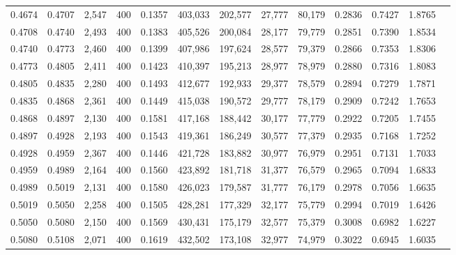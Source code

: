 \begin{tabular}{rrrrrrrrrrrrr}
0.4674 & 0.4707 &  2,547 &   400 &                                     0.1357 & 403,033 & 202,577 &  27,777 &  80,179 & 0.2836 & 0.7427 & 1.8765 \\
0.4708 & 0.4740 &  2,493 &   400 &                                     0.1383 & 405,526 & 200,084 &  28,177 &  79,779 & 0.2851 & 0.7390 & 1.8534 \\
0.4740 & 0.4773 &  2,460 &   400 &                                     0.1399 & 407,986 & 197,624 &  28,577 &  79,379 & 0.2866 & 0.7353 & 1.8306 \\
0.4773 & 0.4805 &  2,411 &   400 &                                     0.1423 & 410,397 & 195,213 &  28,977 &  78,979 & 0.2880 & 0.7316 & 1.8083 \\
0.4805 & 0.4835 &  2,280 &   400 &                                     0.1493 & 412,677 & 192,933 &  29,377 &  78,579 & 0.2894 & 0.7279 & 1.7871 \\
0.4835 & 0.4868 &  2,361 &   400 &                                     0.1449 & 415,038 & 190,572 &  29,777 &  78,179 & 0.2909 & 0.7242 & 1.7653 \\
0.4868 & 0.4897 &  2,130 &   400 &                                     0.1581 & 417,168 & 188,442 &  30,177 &  77,779 & 0.2922 & 0.7205 & 1.7455 \\
0.4897 & 0.4928 &  2,193 &   400 &                                     0.1543 & 419,361 & 186,249 &  30,577 &  77,379 & 0.2935 & 0.7168 & 1.7252 \\
0.4928 & 0.4959 &  2,367 &   400 &                                     0.1446 & 421,728 & 183,882 &  30,977 &  76,979 & 0.2951 & 0.7131 & 1.7033 \\
0.4959 & 0.4989 &  2,164 &   400 &                                     0.1560 & 423,892 & 181,718 &  31,377 &  76,579 & 0.2965 & 0.7094 & 1.6833 \\
0.4989 & 0.5019 &  2,131 &   400 &                                     0.1580 & 426,023 & 179,587 &  31,777 &  76,179 & 0.2978 & 0.7056 & 1.6635 \\
0.5019 & 0.5050 &  2,258 &   400 &                                     0.1505 & 428,281 & 177,329 &  32,177 &  75,779 & 0.2994 & 0.7019 & 1.6426 \\
0.5050 & 0.5080 &  2,150 &   400 &                                     0.1569 & 430,431 & 175,179 &  32,577 &  75,379 & 0.3008 & 0.6982 & 1.6227 \\
0.5080 & 0.5108 &  2,071 &   400 &                                     0.1619 & 432,502 & 173,108 &  32,977 &  74,979 & 0.3022 & 0.6945 & 1.6035 \\

\end{tabular}

